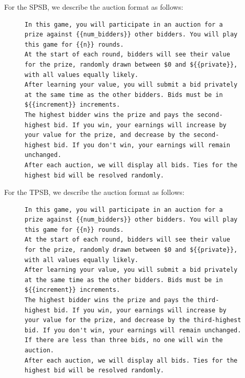 \documentclass{article} %
\begin{document}
For the SPSB, we describe the auction format as follows:
\begin{figure}
\centering
\begin{minipage}{0.95\textwidth}
\begin{lstlisting}
In this game, you will participate in an auction for a prize against {{num_bidders}} other bidders. You will play this game for {{n}} rounds.
At the start of each round, bidders will see their value for the prize, randomly drawn between $0 and ${{private}}, with all values equally likely.
After learning your value, you will submit a bid privately at the same time as the other bidders. Bids must be in ${{increment}} increments.
The highest bidder wins the prize and pays the second-highest bid. If you win, your earnings will increase by your value for the prize, and decrease by the second-highest bid. If you don't win, your earnings will remain unchanged.
After each auction, we will display all bids. Ties for the highest bid will be resolved randomly.
\end{lstlisting}
\end{minipage}
\label{fig:sealbid_prompt-2}
\end{figure}


For the TPSB, we describe the auction format as follows:
\begin{figure}
\centering
\begin{minipage}{0.95\textwidth}
\begin{lstlisting}
In this game, you will participate in an auction for a prize against {{num_bidders}} other bidders. You will play this game for {{n}} rounds.
At the start of each round, bidders will see their value for the prize, randomly drawn between $0 and ${{private}}, with all values equally likely.
After learning your value, you will submit a bid privately at the same time as the other bidders. Bids must be in ${{increment}} increments.
The highest bidder wins the prize and pays the third-highest bid. If you win, your earnings will increase by your value for the prize, and decrease by the third-highest bid. If you don't win, your earnings will remain unchanged. If there are less than three bids, no one will win the auction.
After each auction, we will display all bids. Ties for the highest bid will be resolved randomly.
\end{lstlisting}
\end{minipage}
\label{fig:sealbid_prompt-3}
\end{figure}
\end{document}

